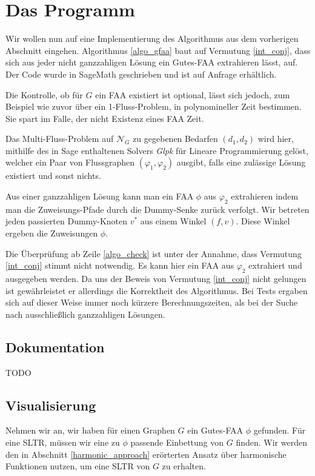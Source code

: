 \chapter{Das Programm}\label{the_program}

Wir wollen nun auf eine Implementierung des Algorithmus aus dem vorherigen Abschnitt eingehen. Algorithmus \ref{algo_gfaa} baut auf Vermutung \ref{int_conj}, dass sich aus jeder nicht ganzzahligen Lösung ein Gutes-FAA extrahieren lässt, auf. Der Code wurde in SageMath \cite{sage} geschrieben und ist auf Anfrage erhältlich.



Die Kontrolle, ob für $G$ ein FAA existiert ist optional, lässt sich jedoch, zum Beispiel wie zuvor über ein 1-Fluss-Problem, in polynomineller Zeit bestimmen. Sie spart im Falle, der nicht Existenz eines FAA Zeit. 

Das Multi-Fluss-Problem auf $\mathcal{N}_G$ zu gegebenen Bedarfen $(d_1,d_2)$ wird hier, mithilfe des in Sage enthaltenen Solvers \textit{Glpk} \cite{glpk} für Lineare Programmierung gelöst, welcher ein Paar von Flussgraphen $(\varphi_1,\varphi_2)$ ausgibt, falls eine zulässige Lösung existiert und sonst nichts.

Aus einer ganzzahligen Lösung kann man ein FAA $\phi$ aus $\varphi_2$ extrahieren indem man die Zuweisungs-Pfade durch die Dummy-Senke zurück verfolgt. Wir betreten jeden passierten Dummy-Knoten $v^*$ aus einem Winkel $(f,v)$. Diese Winkel ergeben die Zuweisungen $\phi$.

Die Überprüfung ab Zeile \ref{algo_check} ist unter der Annahme, dass Vermutung \ref{int_conj} stimmt nicht notwendig. Es kann hier ein FAA aus $\varphi_2$ extrahiert und ausgegeben werden. Da uns der Beweis von Vermutung \ref{int_conj} nicht gelungen ist gewährleistet er allerdings die Korrektheit des Algorithmus. Bei Tests ergaben sich auf dieser Weise immer noch kürzere Berechnungszeiten, als bei der Suche nach ausschließlich ganzzahligen Lösungen.

\section{Dokumentation}

TODO

\section{Visualisierung}

Nehmen wir an, wir haben für einen Graphen $G$ ein Gutes-FAA $\phi$ gefunden. Für eine SLTR, müssen wir eine zu $\phi$ passende Einbettung von $G$ finden. Wir werden den in Abschnitt \ref{harmonic_approach} erörterten Ansatz über harmonische Funktionen nutzen, um eine SLTR von $G$ zu erhalten.

